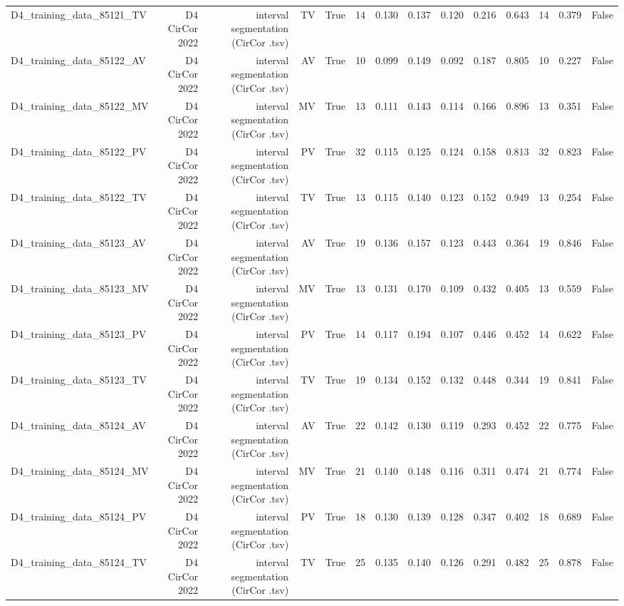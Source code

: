 \begin{table}[htbp]
\begin{tabular}{lrrrrrrrrrrrrr}
    D4\_training\_data\_85121\_TV & D4 CirCor 2022 & interval segmentation (CirCor .tsv) & TV & True & 14 & 0.130 & 0.137 & 0.120 & 0.216 & 0.643 & 14 & 0.379 & False \\
    D4\_training\_data\_85122\_AV & D4 CirCor 2022 & interval segmentation (CirCor .tsv) & AV & True & 10 & 0.099 & 0.149 & 0.092 & 0.187 & 0.805 & 10 & 0.227 & False \\
    D4\_training\_data\_85122\_MV & D4 CirCor 2022 & interval segmentation (CirCor .tsv) & MV & True & 13 & 0.111 & 0.143 & 0.114 & 0.166 & 0.896 & 13 & 0.351 & False \\
    D4\_training\_data\_85122\_PV & D4 CirCor 2022 & interval segmentation (CirCor .tsv) & PV & True & 32 & 0.115 & 0.125 & 0.124 & 0.158 & 0.813 & 32 & 0.823 & False \\
    D4\_training\_data\_85122\_TV & D4 CirCor 2022 & interval segmentation (CirCor .tsv) & TV & True & 13 & 0.115 & 0.140 & 0.123 & 0.152 & 0.949 & 13 & 0.254 & False \\
    D4\_training\_data\_85123\_AV & D4 CirCor 2022 & interval segmentation (CirCor .tsv) & AV & True & 19 & 0.136 & 0.157 & 0.123 & 0.443 & 0.364 & 19 & 0.846 & False \\
    D4\_training\_data\_85123\_MV & D4 CirCor 2022 & interval segmentation (CirCor .tsv) & MV & True & 13 & 0.131 & 0.170 & 0.109 & 0.432 & 0.405 & 13 & 0.559 & False \\
    D4\_training\_data\_85123\_PV & D4 CirCor 2022 & interval segmentation (CirCor .tsv) & PV & True & 14 & 0.117 & 0.194 & 0.107 & 0.446 & 0.452 & 14 & 0.622 & False \\
    D4\_training\_data\_85123\_TV & D4 CirCor 2022 & interval segmentation (CirCor .tsv) & TV & True & 19 & 0.134 & 0.152 & 0.132 & 0.448 & 0.344 & 19 & 0.841 & False \\
    D4\_training\_data\_85124\_AV & D4 CirCor 2022 & interval segmentation (CirCor .tsv) & AV & True & 22 & 0.142 & 0.130 & 0.119 & 0.293 & 0.452 & 22 & 0.775 & False \\
    D4\_training\_data\_85124\_MV & D4 CirCor 2022 & interval segmentation (CirCor .tsv) & MV & True & 21 & 0.140 & 0.148 & 0.116 & 0.311 & 0.474 & 21 & 0.774 & False \\
    D4\_training\_data\_85124\_PV & D4 CirCor 2022 & interval segmentation (CirCor .tsv) & PV & True & 18 & 0.130 & 0.139 & 0.128 & 0.347 & 0.402 & 18 & 0.689 & False \\
    D4\_training\_data\_85124\_TV & D4 CirCor 2022 & interval segmentation (CirCor .tsv) & TV & True & 25 & 0.135 & 0.140 & 0.126 & 0.291 & 0.482 & 25 & 0.878 & False \\

\end{tabular}
\end{table}
